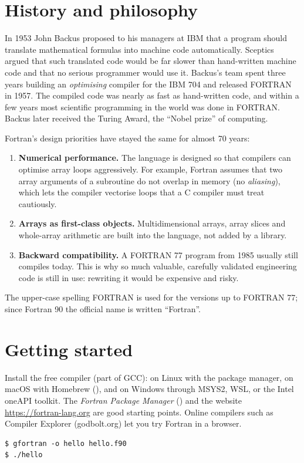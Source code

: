 \section{History and philosophy}

\begin{history}
In 1953 John Backus proposed to his managers at IBM that a program should translate
mathematical formulas into machine code automatically. Sceptics argued that such
translated code would be far slower than hand-written machine code and that no serious
programmer would use it. Backus's team spent three years building an \emph{optimising}
compiler for the IBM 704 and released FORTRAN in 1957. The compiled code was nearly as fast
as hand-written code, and within a few years most scientific programming in the world was
done in FORTRAN. Backus later received the Turing Award, the ``Nobel prize'' of computing.
\end{history}

Fortran's design priorities have stayed the same for almost 70 years:
\begin{enumerate}
\item \textbf{Numerical performance.} The language is designed so that compilers can
  optimise array loops aggressively. For example, Fortran assumes that two array arguments
  of a subroutine do not overlap in memory (no \emph{aliasing}), which lets the compiler
  vectorise loops that a C compiler must treat cautiously.
\item \textbf{Arrays as first-class objects.} Multidimensional arrays, array slices and
  whole-array arithmetic are built into the language, not added by a library.
\item \textbf{Backward compatibility.} A FORTRAN 77 program from 1985 usually still compiles
  today. This is why so much valuable, carefully validated engineering code is still in
  use: rewriting it would be expensive and risky.
\end{enumerate}

The upper-case spelling FORTRAN is used for the versions up to FORTRAN 77; since Fortran 90
the official name is written ``Fortran''.

\section{Getting started}

Install the free  compiler (part of GCC): on Linux with the package
manager, on macOS with Homebrew (), and on Windows through MSYS2,
WSL, or the Intel oneAPI toolkit. The \emph{Fortran Package Manager} () and the
website \url{https://fortran-lang.org} are good starting points. Online compilers such as
Compiler Explorer (godbolt.org) let you try Fortran in a browser.
\begin{lstlisting}[style=shell]
$ gfortran -o hello hello.f90
$ ./hello
\end{lstlisting}

